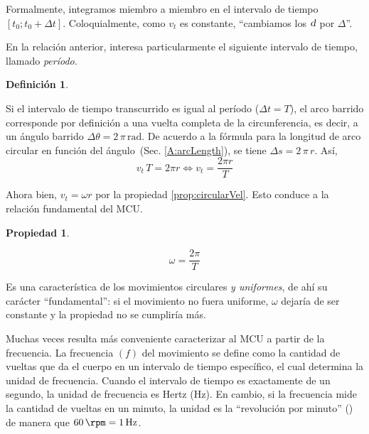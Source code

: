 \documentclass[a5paper,12pt,twoside]{book}
\newtheorem{defn}{{Definición}}[chapter]
\newtheorem{prop}{{Propiedad}}[chapter]
\begin{document}
Formalmente, integramos miembro a miembro en el intervalo de tiempo $\left[ t_0; t_0 + \Delta t \right]$.
Coloquialmente, como $v_t$ es constante, ``cambiamos los $\textsl{d}$ por $\Delta$''.

En la relación anterior, interesa particularmente el siguiente intervalo de tiempo, llamado \emph{período}.

\begin{mdframed}[style=MyFrame1]
    \begin{defn}
    \end{defn}
\end{mdframed}

Si el intervalo de tiempo transcurrido es igual al período ($\Delta t = T$), el arco barrido corresponde por definición a una vuelta completa de la circunferencia, es decir, a un ángulo barrido $\Delta \theta = 2 \, \pi \, \si{\radian}$.
De acuerdo a la fórmula para la longitud de arco circular en función del ángulo~(Sec. \ref{A:arcLength}), se tiene $\Delta s = 2 \, \pi \, r$.
Así,
\[ v_t \, T = 2 \pi r \iff v_t = \frac{2 \pi r}{T} \]

Ahora bien, $v_t = \omega r$ por la propiedad \ref{prop:circularVel}.
Esto conduce a la relación fundamental del MCU.

\begin{mdframed}[style=MyFrame1]
    \begin{prop}
        \label{prop:period}
    \end{prop}
    \begin{equation*}
        \omega = \frac{2 \pi}{T}
    \end{equation*}
\end{mdframed}

Es una característica de los movimientos circulares \emph{y uniformes}, de ahí su carácter ``fundamental'':
si el movimiento no fuera uniforme, $\omega$ dejaría de ser constante y la propiedad no se cumpliría más.

Muchas veces resulta más conveniente caracterizar al MCU a partir de la frecuencia.
La frecuencia $(f)$ del movimiento se define como la cantidad de vueltas que da el cuerpo en un intervalo de tiempo específico, el cual determina la unidad de frecuencia.
Cuando el intervalo de tiempo es exactamente de un segundo, la unidad de frecuencia es Hertz (\si{\hertz}).
En cambio, si la frecuencia mide la cantidad de vueltas en un minuto, la unidad es la ``revolución por minuto'' (\si{\rpm}) de manera que $\SI{60}{\rpm} = \SI{1}{\hertz}$.
\end{document}
